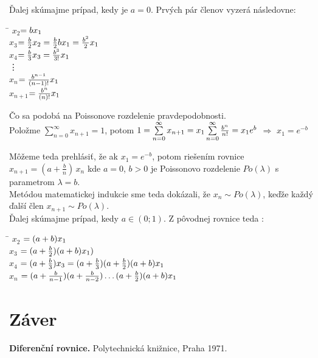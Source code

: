 \documentclass[a4paper,10pt]{article}
\theoremstyle{plain}
\theoremstyle{definition}
\begin{document}
Ďalej skúmajme prípad, kedy je $ a=0 $. Prvých pár členov vyzerá následovne: 
\begin{spacing}{1.6}
\begin{tabbing}
\hspace{1cm}\=\kill
$ x_{2}$\>$=b\*x_{1}    $\\
$ x_{3}$\>$=\frac{b}{2}\*x_{2} = \frac{b}{2}\*b\*x_{1}=\frac{b^{2}}{2}\*x_{1}   $\\
$ x_{4}$\>$=\frac{b}{3}\*x_{3} = \frac{b^{3}}{3!}\*x_{1}  $\\
\vdots \\
$ x_{n}$\>$=\frac{b^{n-1}}{(n-1)!}\*x_{1}    $\\
$ x_{n+1}$\>$=\frac{b^{n}}{(n)!}\*x_{1}    $\\
\end{tabbing} 
\end{spacing}
Čo sa podobá na Poissonove rozdelenie pravdepodobnosti. \\
Položme $ \sum\limits_{n=0}^\infty x_{n+1} = 1 $, potom $ 1=\sum\limits_{n=0}^\infty x_{n+1} = x_{1}\*\sum\limits_{n=0}^\infty \frac{b^{n}}{n!} = x_{1}\*e^{b}$ $ \Rightarrow $ $ x_{1} = e^{-b} $

Môžeme teda prehlásiť, že ak $x_{1}=e^{-b} $, potom riešením rovnice
$x_{n+1}=\left(a+{\frac{b}{n}}\right)\,x_{n}$ kde $a=0$, $b>0$
je Poissonovo rozdelenie $Po(\lambda)$ s parametrom $\lambda=b$.\\
Metódou matematickej indukcie sme teda dokázali, že $x_{n}\sim Po(\lambda)$, keďže každý ďalší člen $x_{n+1}\sim Po(\lambda)$.\\


Ďalej skúmajme prípad, kedy $ a \in (0;1) $. Z pôvodnej rovnice teda :\\
\begin{spacing}{1.6}
\begin{tabbing}
\hspace{0.5cm}\=\kill 
$ x_{2}$ \> $=(a+b)\*x_{1} $\\
$ x_{3}$ \> $=(a + \frac{b}{2}) \* (a + b)\*x_{1} ) $\\
$ x_{4}$ \> $=(a + \frac{b}{3})\*x_{3}= (a + \frac{b}{3})\*(a + \frac{b}{2})\*(a + b)\*x_{1} $\\
$ x_{n}$ \> $=(a + \frac{b}{n-1})\*(a + \frac{b}{n-2}) \ldots (a + \frac{b}{2})\*(a + b)\*x_{1}$\\
\end{tabbing} 
\end{spacing}
\newpage
\section{Záver}


\begin{thebibliography}{9}
               {\bf Diferenční rovnice.}
           Polytechnická knižnice, Praha 1971.
\end{thebibliography}
\end{document}
